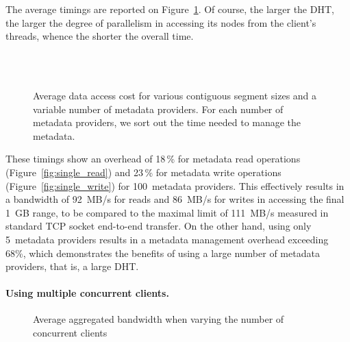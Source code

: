 \documentclass{llncs}
\begin{document}
The average timings are reported on
Figure~\ref{fig:single_results}. 
Of course, the larger the DHT, the larger the
degree of parallelism in accessing its nodes from the client's threads,
whence the shorter the overall time.

\begin{figure}[p]
\centering
{}
\\ \leavevmode \vfill \leavevmode \\
\caption{Average data access cost for various contiguous segment sizes
    and a variable number of metadata providers. For each number of
    metadata providers, we sort out the time needed to manage the metadata.}
  \label{fig:single_results}
\end{figure}

These timings show an overhead of 18\,\% for metadata read operations
(Figure~\ref{fig:single_read}) and 23\,\% for metadata write operations
(Figure~\ref{fig:single_write}) for 100~metadata providers. This effectively
results in a bandwidth of 92~MB/s for reads and 86~MB/s for writes
in accessing the final 1~GB range, 
to be compared to the maximal limit of 111~MB/s measured in
standard TCP socket end-to-end transfer.  On the other hand, 
using only 5~metadata providers results in a
metadata management overhead exceeding 68\%,
which demonstrates the benefits of using a large number of metadata
providers, that is, a large DHT.

\paragraph{Using multiple concurrent clients.}

\begin{figure}
  \centerline{
\hfill
{}
\hfill
{}
\hfill
}
  \caption{Average aggregated bandwidth when varying the number of concurrent
    clients}
  \label{fig:multi_results}
\end{figure}
\end{document}
